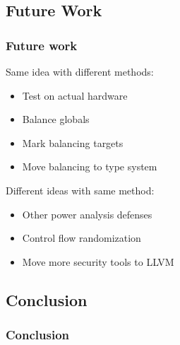 \documentclass[11pt,t,usepdftitle=false,aspectratio=169]{beamer}
\begin{document}
\subsection{Future Work}
\begin{frame}
  \frametitle{Future work}
  Same idea with different methods:
  \begin{itemize}
  \item Test on actual hardware
  \item Balance globals
  \item Mark balancing targets
  \item Move balancing to type system
  \end{itemize}
  \vspace{0.5cm}
  Different ideas with same method:
  \begin{itemize}
  \item Other power analysis defenses
  \item Control flow randomization
  \item Move more security tools to LLVM
  \end{itemize}
\end{frame}

\subsection{Conclusion}
\begin{frame}
  \frametitle{Conclusion}

\end{frame}
\end{document}

